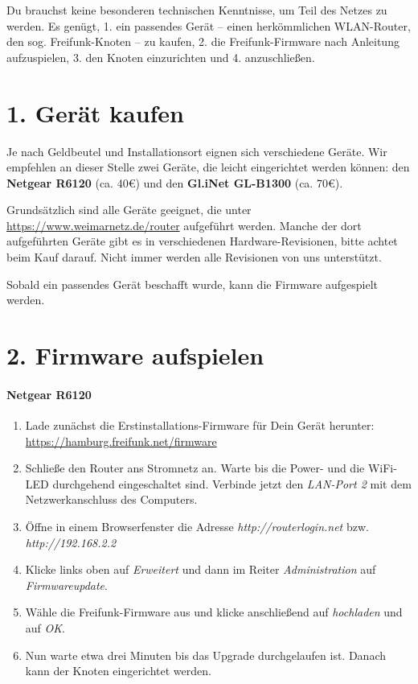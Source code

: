 \documentclass[10pt,a4paper,notumble]{leaflet}
\begin{document}
Du brauchst keine besonderen technischen Kenntnisse, um Teil des Netzes zu werden. Es genügt, 1. ein passendes Gerät -- einen herkömmlichen WLAN-Router, den sog. Freifunk-Knoten -- zu kaufen, 2. die Freifunk-Firmware nach Anleitung aufzuspielen, 3. den Knoten einzurichten und 4. anzuschließen.


\section{1. Gerät kaufen}
Je nach Geldbeutel und Installationsort eignen sich verschiedene Geräte. Wir empfehlen an dieser Stelle zwei Geräte, die leicht eingerichtet werden können: den \textbf{Netgear R6120} (ca. 40€) und den \textbf{Gl.iNet GL-B1300} (ca. 70€).

Grundsätzlich sind alle Geräte geeignet, die unter \href{https://www.weimarnetz.de/router}{https://www.weimarnetz.de/router} aufgeführt werden. Manche der dort aufgeführten Geräte gibt es in verschiedenen Hardware-Revisionen, bitte achtet beim Kauf darauf. Nicht immer werden alle Revisionen von uns unterstützt.

Sobald ein passendes Gerät beschafft wurde, kann die Firmware aufgespielt werden.


\newpage


\section{2. Firmware aufspielen}

\paragraph{Netgear R6120}
\begin{enumerate}
 \item Lade zunächst die Erstinstallations-Firmware für Dein Gerät herunter: \href{https://hamburg.freifunk.net/firmware}{https://hamburg.freifunk.net/firmware}
 \item Schließe den Router ans Stromnetz an. Warte bis die Power- und die WiFi-LED durchgehend eingeschaltet sind. Verbinde jetzt den \textit{LAN-Port 2} mit dem Netzwerkanschluss des Computers.
 \item Öffne in einem Browserfenster die Adresse \textit{http://routerlogin.net} bzw. \textit{http://192.168.2.2}
 \item Klicke links oben auf \textit{Erweitert} und dann im Reiter \textit{Administration} auf \textit{Firmwareupdate}.
 \item Wähle die Freifunk-Firmware aus und klicke anschließend auf \textit{hochladen} und auf \textit{OK}.
 \item Nun warte etwa drei Minuten bis das Upgrade durchgelaufen ist. Danach kann der Knoten eingerichtet werden.
\end{enumerate}
\end{document}
